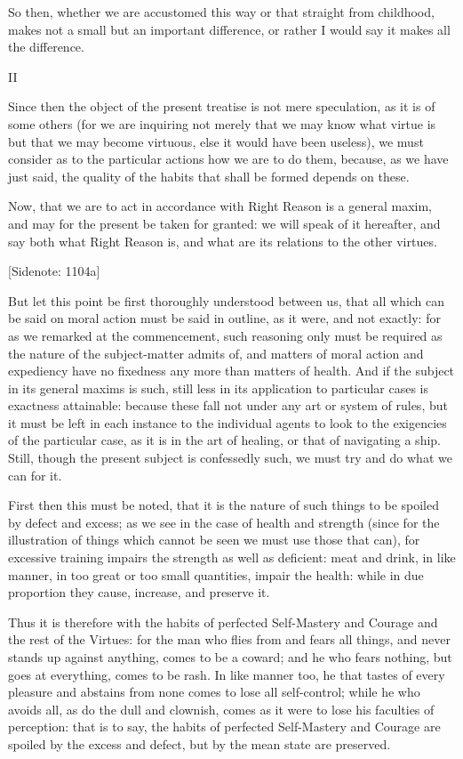 So then, whether we are accustomed this way or that straight from
childhood, makes not a small but an important difference, or rather I
would say it makes all the difference.


II

Since then the object of the present treatise is not mere speculation,
as it is of some others (for we are inquiring not merely that we may
know what virtue is but that we may become virtuous, else it would have
been useless), we must consider as to the particular actions how we are
to do them, because, as we have just said, the quality of the habits
that shall be formed depends on these.

Now, that we are to act in accordance with Right Reason is a general
maxim, and may for the present be taken for granted: we will speak of it
hereafter, and say both what Right Reason is, and what are its relations
to the other virtues.

[Sidenote: 1104a]

But let this point be first thoroughly understood between us, that all
which can be said on moral action must be said in outline, as it were,
and not exactly: for as we remarked at the commencement, such reasoning
only must be required as the nature of the subject-matter admits of, and
matters of moral action and expediency have no fixedness any more than
matters of health. And if the subject in its general maxims is such,
still less in its application to particular cases is exactness
attainable: because these fall not under any art or system of rules, but
it must be left in each instance to the individual agents to look to the
exigencies of the particular case, as it is in the art of healing,
or that of navigating a ship. Still, though the present subject is
confessedly such, we must try and do what we can for it.

First then this must be noted, that it is the nature of such things to
be spoiled by defect and excess; as we see in the case of health and
strength (since for the illustration of things which cannot be seen we
must use those that can), for excessive training impairs the strength as
well as deficient: meat and drink, in like manner, in too great or too
small quantities, impair the health: while in due proportion they cause,
increase, and preserve it.

Thus it is therefore with the habits of perfected Self-Mastery and
Courage and the rest of the Virtues: for the man who flies from and
fears all things, and never stands up against anything, comes to be a
coward; and he who fears nothing, but goes at everything, comes to be
rash. In like manner too, he that tastes of every pleasure and abstains
from none comes to lose all self-control; while he who avoids all, as
do the dull and clownish, comes as it were to lose his faculties of
perception: that is to say, the habits of perfected Self-Mastery and
Courage are spoiled by the excess and defect, but by the mean state are
preserved.

